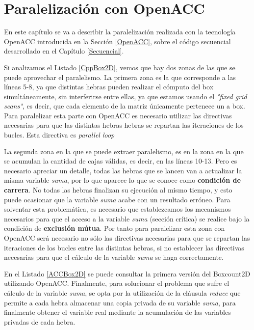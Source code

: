 \chapter{Paralelización con OpenACC}
\label{ParalelizacionOpenACC}
En este capítulo se va a describir la paralelización realizada con la tecnología OpenACC introducida en la Sección \ref{OpenACC}, sobre el código secuencial desarrollado en el Capítulo \ref{Secuencial}.

Si analizamos el Listado \ref{CppBox2D}, vemos que hay dos zonas de las que se puede aprovechar el paralelismo. La primera zona es la que corresponde a las líneas 5-8, ya que distintas hebras pueden realizar el cómputo del box simultáneamente, sin interferirse entre ellas, ya que estamos usando el \textit{"fixed grid scans"}, es decir, que cada elemento de la matriz únicamente pertenece un a box. Para paralelizar esta parte con OpenACC es necesario utilizar las directivas necesarias para que las distintas hebras hebras se repartan las iteraciones de los bucles. Esta directiva es \textit{parallel loop} 

La segunda zona en la que se puede extraer paralelismo, es en la zona en la que se acumulan la cantidad de cajas válidas, es decir, en las líneas 10-13. Pero es necesario apreciar un detalle, todas las hebras que se lancen van a actualizar la misma variable \textit{suma}, por lo que aparece lo que se conoce como \textbf{condición de carrera}. No todas las hebras finalizan su ejecución al mismo tiempo, y esto puede ocasionar que la variable \textit{suma} acabe con un resultado erróneo. Para solventar esta problemática, es necesario que establezcamos los mecanismos necesarios para que el acceso a la variable \textit{suma} (sección crítica) se realice bajo la condición de \textbf{exclusión mútua}. Por tanto para paralelizar esta zona con OpenACC será necesario no sólo las directivas necesarias para que se repartan las iteraciones de los bucles entre las distintas hebras, si no establecer las directivas necesarias para que el cálculo de la variable \textit{suma} se haga correctamente.

En el Listado \ref{ACCBox2D} se puede consultar la primera versión del Boxcount2D utilizando OpenACC. Finalmente, para solucionar el problema que sufre el cálculo de la variable \textit{suma}, se opta por la utilización de la cláusula \textit{reduce} que permite a cada hebra almacenar una copia privada de su variable \textit{suma}, para finalmente obtener el variable real mediante la acumulación de las variables privadas de cada hebra.


